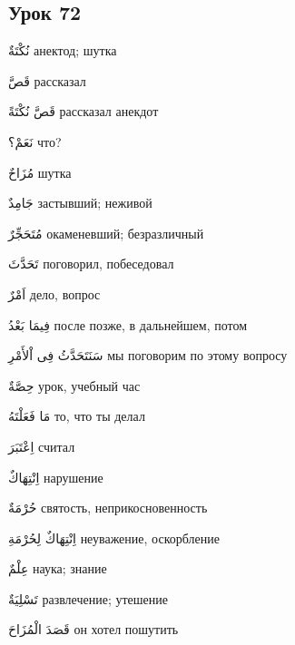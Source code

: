 \documentclass[a5paper]{article}
\newcommand\textstyleDropCaps[1]{#1}
\newcommand\textstyleCaptioncharacters[1]{#1}
\begin{document}
\subsection[Урок 72‎]{\textstyleDropCaps{Урок 72‎}}
\textstyleCaptioncharacters{نُكْتَةٌ }\textstyleDropCaps{анектод; шутка‎}

\textstyleCaptioncharacters{قَصَّ }\textstyleDropCaps{рассказал‎}

\textstyleCaptioncharacters{قَصَّ نُكْتَةً }\textstyleDropCaps{рассказал анекдот‎}

\textstyleCaptioncharacters{نَعَمْ؟ }\textstyleDropCaps{что?‎}

\textstyleCaptioncharacters{مُزَاحٌ }\textstyleDropCaps{шутка‎}

\textstyleCaptioncharacters{جَامِدٌ }\textstyleDropCaps{застывший; нежи­вой‎}

\textstyleCaptioncharacters{مُتَحَجِّرٌ }\textstyleDropCaps{окаменевший; безразличный‎}

\textstyleCaptioncharacters{تَحَدَّثَ }\textstyleDropCaps{поговорил, побе­седовал‎}

\textstyleCaptioncharacters{اَمْرٌ }\textstyleDropCaps{дело, вопрос‎}

\textstyleCaptioncharacters{فِيمَا بَعْدُ }\textstyleDropCaps{после позже, в дальнейшем, потом‎}

\textstyleCaptioncharacters{سَنَتَحَدَّثُ فِى اْلأَمْرِ }\textstyleDropCaps{мы поговорим по этому вопросу‎}

\textstyleCaptioncharacters{حِصَّةٌ }\textstyleDropCaps{урок, учебный час‎}

\textstyleCaptioncharacters{مَا فَعَلْتَهُ }\textstyleDropCaps{то, что ты делал‎}

\textstyleCaptioncharacters{اِعْتَبَرَ }\textstyleDropCaps{считал‎}

\textstyleCaptioncharacters{اِنْتِهَاكٌ }\textstyleDropCaps{нарушение‎}

\textstyleCaptioncharacters{حُرْمَةٌ }\textstyleDropCaps{святость, неприкос­новенность‎}

\textstyleCaptioncharacters{اِنْتِهَاكٌ لِحُرْمَةِ }\textstyleDropCaps{неуваже­ние, оскорбление‎}

\textstyleCaptioncharacters{عِلْمٌ }\textstyleDropCaps{наука; знание‎}

\textstyleCaptioncharacters{تَسْلِيَةٌ }\textstyleDropCaps{развлечение; уте­шение‎}

\textstyleCaptioncharacters{قَصَدَ الْمُزَاحَ }\textstyleDropCaps{он хотел по­шутить‎}
\end{document}
